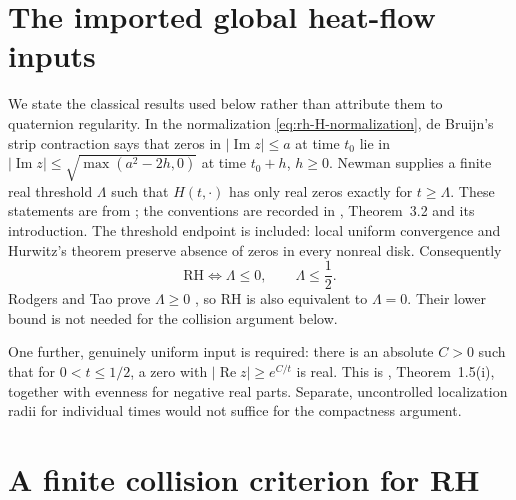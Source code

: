 \documentclass[11pt]{article}
\numberwithin{equation}{section}
\theoremstyle{definition}
\theoremstyle{remark}
\begin{document}
\section{The imported global heat-flow inputs}
\label{sec:rh-global-inputs}

We state the classical results used below rather than attribute them to
quaternion regularity.  In the normalization
\eqref{eq:rh-H-normalization}, de Bruijn's strip contraction says that
zeros in $|\operatorname{Im}z|\le a$ at time $t_0$ lie in
$|\operatorname{Im}z|\le\sqrt{\max(a^2-2h,0)}$ at time $t_0+h$,
$h\ge0$.  Newman supplies a finite real threshold $\Lambda$ such that
$H(t,\cdot)$ has only real zeros exactly for $t\ge\Lambda$.
These statements are from \cite{debruijn,newman}; the conventions are
recorded in \cite{polymath}, Theorem~3.2 and its introduction.
The threshold endpoint is included: local uniform convergence and
Hurwitz's theorem preserve absence of zeros in every nonreal disk.
Consequently
\begin{equation}
 \mathrm{RH}\iff\Lambda\le0,\qquad \Lambda\le\frac12.
 \label{eq:rh-threshold-equivalence}
\end{equation}
Rodgers and Tao prove $\Lambda\ge0$ \cite{rodgerstao}, so RH is also
equivalent to $\Lambda=0$.  Their lower bound is not needed for the
collision argument below.

One further, genuinely uniform input is required: there is an absolute
$C>0$ such that for $0<t\le1/2$, a zero with
$|\operatorname{Re}z|\ge e^{C/t}$ is real.  This is
\cite{polymath}, Theorem~1.5(i), together with evenness for negative
real parts.  Separate, uncontrolled localization radii for individual
times would not suffice for the compactness argument.

\section{A finite collision criterion for RH}
\label{sec:rh-collision}
\end{document}
